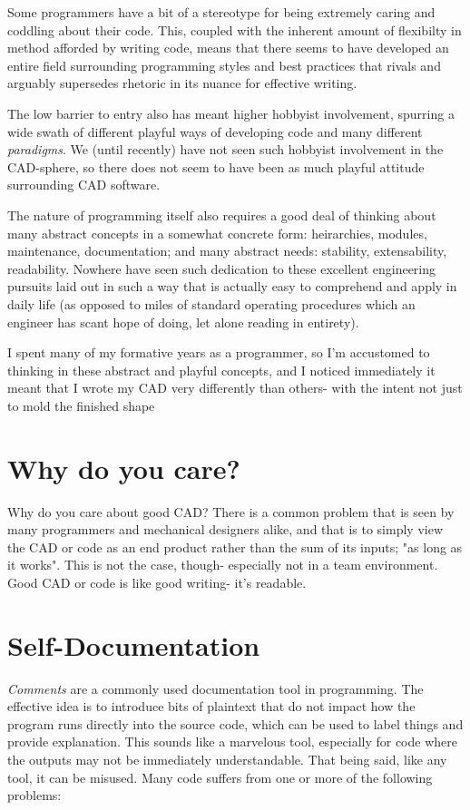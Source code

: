 Some programmers have a bit of a stereotype for being extremely caring and coddling about their code. This, coupled with the inherent amount of flexibilty in method afforded by writing code, means that there seems to have developed an entire field surrounding programming styles and best practices that rivals and arguably supersedes rhetoric in its nuance for effective writing.

The low barrier to entry also has meant higher hobbyist involvement, spurring a wide swath of different playful ways of developing code and many different \textit{paradigms}. We (until recently) have not seen such hobbyist involvement in the CAD-sphere, so there does not seem to have been as much playful attitude surrounding CAD software.

The nature of programming itself also requires a good deal of thinking about many abstract concepts in a somewhat concrete form: heirarchies, modules, maintenance, documentation; and many abstract needs: stability, extensability, readability. Nowhere have seen such dedication to these excellent engineering pursuits laid out in such a way that is actually easy to comprehend and apply in daily life (as opposed to miles of standard operating procedures which an engineer has scant hope of doing, let alone reading in entirety). 

I spent many of my formative years as a programmer, so I'm accustomed to thinking in these abstract and playful concepts, and I noticed immediately it meant that I wrote my CAD very differently than others- with the intent not just to mold the finished shape

\section{Why do you care?}

Why do you care about good CAD? There is a common problem that is seen by many programmers and mechanical designers alike, and that is to simply view the CAD or code as an end product rather than the sum of its inputs; "as long as it works". This is not the case, though- especially not in a team environment. Good CAD or code is like good writing- it's readable.

\section{Self-Documentation}

\textit{Comments} are a commonly used documentation tool in programming. The effective idea is to introduce bits of plaintext that do not impact how the program runs directly into the source code, which can be used to label things and provide explanation. This sounds like a marvelous tool, especially for code where the outputs may not be immediately understandable. That being said, like any tool, it can be misused. Many code suffers from one or more of the following problems:

